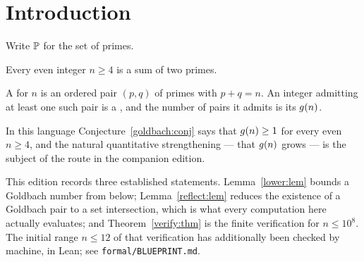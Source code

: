 \section{Introduction}\label{sec:intro}

Write $\mathbb{P}$ for the set of primes.

\begin{conjecture}[Goldbach]\label{goldbach:conj}
Every even integer $n\geq4$ is a sum of two primes.
\end{conjecture}

\begin{definition}\label{pair:def}
A  for $n$ is an ordered pair $(p,q)$ of
primes with $p+q=n$.  An integer admitting at least one such pair is a
, and the number of pairs it admits is
its  $g(n)$.
\end{definition}

In this language Conjecture~\ref{goldbach:conj} says that $g(n)\geq1$ for
every even $n\geq4$, and the natural quantitative strengthening --- that
$g(n)$ grows --- is the subject of the route in the companion edition.

This edition records three established statements.
Lemma~\ref{lower:lem} bounds a Goldbach number from below;
Lemma~\ref{reflect:lem} reduces the existence of a Goldbach pair to a set
intersection, which is what every computation here actually evaluates; and
Theorem~\ref{verify:thm} is the finite verification for $n\leq10^{8}$.
The initial range $n\leq12$ of that verification has additionally been checked
by machine, in Lean; see \texttt{formal/BLUEPRINT.md}.
